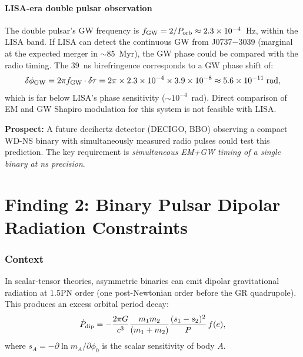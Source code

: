 \documentclass[11pt]{article}
\newcommand{\ee}[1]{\times 10^{#1}}
\begin{document}
\subsection{LISA-era double pulsar observation}

The double pulsar's GW frequency is $f_{\rm GW} = 2/P_{\rm orb}
\approx 2.3\ee{-4}$~Hz, within the LISA band. If LISA can detect
the continuous GW from J0737$-$3039 (marginal at the expected merger
in $\sim 85$~Myr), the GW phase could be compared with the radio
timing. The 39~ns birefringence corresponds to a GW phase shift of:
\begin{equation}
\delta\phi_{\rm GW} = 2\pi f_{\rm GW} \cdot \delta\tau
= 2\pi \times 2.3\ee{-4} \times 3.9\ee{-8} \approx 5.6\ee{-11}
\;\text{rad},
\end{equation}
which is far below LISA's phase sensitivity ($\sim 10^{-4}$~rad).
Direct comparison of EM and GW Shapiro modulation for this system
is not feasible with LISA.

\textbf{Prospect:} A future decihertz detector (DECIGO, BBO) observing
a compact WD-NS binary with simultaneously measured radio pulses
could test this prediction. The key requirement is \emph{simultaneous
EM+GW timing of a single binary at ns precision}.


\part{Finding 2: Binary Pulsar Dipolar Radiation Constraints}
\label{part:dipolar}

\section{Context}

In scalar-tensor theories, asymmetric binaries can emit dipolar
gravitational radiation at 1.5PN order (one post-Newtonian order
before the GR quadrupole). This produces an excess orbital period
decay:
\begin{equation}
\dot{P}_{\rm dip} = -\frac{2\pi G}{c^3}\frac{m_1 m_2}{(m_1+m_2)}
\frac{(s_1 - s_2)^2}{P}\,f(e),
\end{equation}
where $s_A = -\partial\ln m_A/\partial\phi_0$ is the scalar
sensitivity of body $A$.
\end{document}
